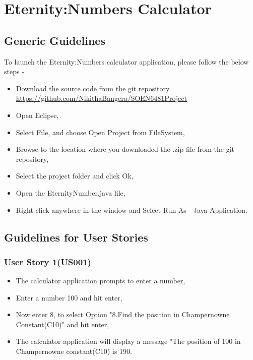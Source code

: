 \documentclass[12pt, a4paper]{report}
\begin{document}
\chapter{Eternity:Numbers Calculator}

\section{Generic Guidelines}

\quad To launch the Eternity:Numbers calculator application, please follow the below steps - 

\begin{itemize}
    \item Download the source code from the git repository \newline \underline{https://github.com/NikithaBangera/SOEN6481Project}
    \item Open Eclipse,
    \item Select File, and choose Open Project from FileSystem,
    \item Browse to the location where you downloaded the .zip file from the git repository,
    \item Select the project folder and click Ok,
    \item Open the EternityNumber.java file,
    \item Right click anywhere in the window and Select Run As - Java Application.
\end{itemize} 

\section{Guidelines for User Stories}

\subsection{User Story 1(US001)}
\begin{itemize}
    \item The calculator application prompts to enter a number,
    \item Enter a number 100 and hit enter,
    \item Now enter 8, to select Option "8.Find the position in Champernowne Constant(C10)" and hit enter,
    \item The calculator application will display a message "The position of 100 in Champernowne constant(C10) is 190.
\end{itemize}
\end{document}
